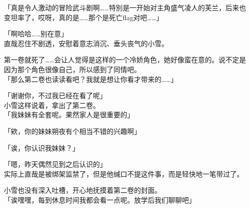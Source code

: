 「真是令人激动的冒险武斗剧啊……特別是一开始对主角盛气凌人的芙兰，后来也变坦率了，哎呀，真的是……那个是死亡flag对吧……」

「啊哈哈……别在意」\\

直哉忍住不剧透，安慰着意志消沉、垂头丧气的小雪。

第一卷就死了……会让人觉得是这样的一个冷娇角色，她好像蛮在意的。说不定是因为那个角色很像自己，所以感到了同情吧。\\

「那么第二卷也读读看吧？我就是想让你看才带来的……」

「谢谢你，不过我已经在看了呢」\\

小雪这样说着，拿出了第二卷。\\

「我妹妹有全套呢。果然家人是很重要的」

「欸，你的妹妹朔夜有个相当不错的兴趣啊」

「诶，你认识我妹妹？」

「嗯，昨天偶然见到之后认识的」\\

实际上直哉是被绑架监禁了，但是他缄口不提这件事，而是轻快地一笔带过了。

小雪也没有深入吐槽，开心地抚摸着第二卷的封面。\\

「诶嘿嘿，每到休息时间我都会看一点呢。放学后我们聊聊吧」

